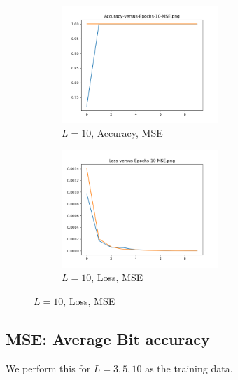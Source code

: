 \begin{figure}[!htbp]
\begin{subfigure}
\centering
\includegraphics[angle=0,width=0.65\textwidth]{assign-3/logs/Accuracy-10-MSE-hidden-5.png}
\caption{$L=10$, Accuracy, MSE}
\end{subfigure}
\begin{subfigure}
\centering
\includegraphics[angle=0,width=0.65\textwidth]{assign-3/logs/Loss-10-MSE-hidden-5.png}
\caption{$L=10$, Loss, MSE}
\end{subfigure}
\end{figure}

\subsection{MSE: Average Bit accuracy}

We perform this for $L=3, 5, 10$ as the training data.

